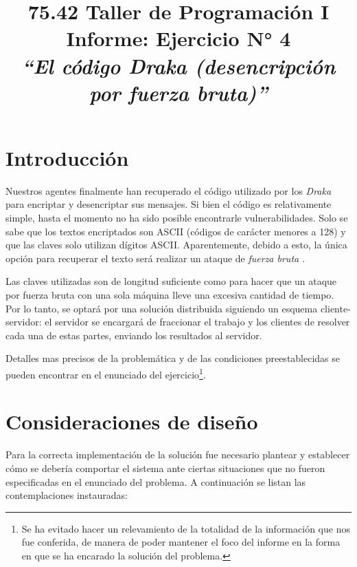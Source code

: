 \documentclass{article}
\begin{document}
\title{\Large 75.42 Taller de Programación I \\ 
	  \medskip\Huge Informe: Ejercicio N° 4  \\
	  \bigskip\Large\textit{``El código Draka (desencripción por fuerza bruta)''}}
\date{}
\maketitle




\section{Introducción}
	
	Nuestros agentes finalmente han recuperado el código utilizado por los \textit{Draka} para encriptar y desencriptar sus mensajes. Si bien el código es relativamente simple, hasta el momento no ha sido posible encontrarle vulnerabilidades. Solo se sabe que los textos encriptados son ASCII \cite{ASCII} (códigos de carácter menores a 128) y que las claves solo utilizan dígitos ASCII. Aparentemente, debido a esto, la única opción para recuperar el texto será realizar un ataque de \textit{fuerza bruta} \cite{FB}.
	\par
	Las claves utilizadas son de longitud suficiente como para hacer que un ataque por fuerza bruta con una sola máquina lleve una excesiva cantidad de tiempo. Por lo tanto, se optará por una solución distribuida siguiendo un esquema cliente-servidor: el servidor se encargará de fraccionar el trabajo y los clientes de resolver cada una de estas partes, enviando los resultados al servidor.
	\par
	Detalles mas precisos de la problemática y de las condiciones preestablecidas se pueden encontrar en el enunciado del ejercicio\footnote{Se ha evitado hacer un relevamiento de la totalidad de la información que nos fue conferida, de manera de poder mantener el foco del informe en la forma en que se ha encarado la solución del problema.}.
\bigskip




\section{Consideraciones de diseño}

	Para la correcta implementación de la solución fue necesario plantear y establecer cómo se debería comportar el sistema ante ciertas situaciones que no fueron especificadas en el enunciado del problema. A continuación se listan las contemplaciones instauradas:
\end{document}
